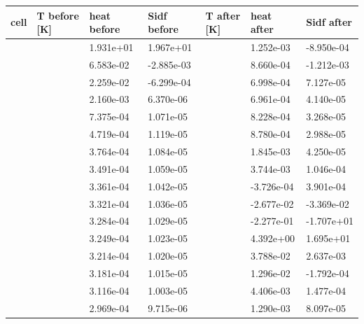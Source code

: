 \documentclass[english,a4paper]{my_memo}
\begin{document}
{\def\LTcaptype{none} %
{\small
\begin{longtable}[]{@{}>{\raggedright\arraybackslash}p{\dimexpr(\linewidth-14\tabcolsep)/7\relax}>{\raggedright\arraybackslash}p{\dimexpr(\linewidth-14\tabcolsep)/7\relax}>{\raggedright\arraybackslash}p{\dimexpr(\linewidth-14\tabcolsep)/7\relax}>{\raggedright\arraybackslash}p{\dimexpr(\linewidth-14\tabcolsep)/7\relax}>{\raggedright\arraybackslash}p{\dimexpr(\linewidth-14\tabcolsep)/7\relax}>{\raggedright\arraybackslash}p{\dimexpr(\linewidth-14\tabcolsep)/7\relax}>{\raggedright\arraybackslash}p{\dimexpr(\linewidth-14\tabcolsep)/7\relax}@{}}
\toprule\noalign{}
cell & T before {[}K{]} & heat before & Sidf before & T after {[}K{]} & heat after & Sidf after \\
\midrule\noalign{}
\endhead
\bottomrule\noalign{}
\endlastfoot
1 & 57.2 & 1.931e+01 & 1.967e+01 & 334.8 & 1.252e-03 & -8.950e-04 \\
2 & 229.0 & 6.583e-02 & -2.885e-03 & 416.9 & 8.660e-04 & -1.212e-03 \\
3 & 294.8 & 2.259e-02 & -6.299e-04 & 487.9 & 6.998e-04 & 7.127e-05 \\
10 & 495.8 & 2.160e-03 & 6.370e-06 & 858.3 & 6.961e-04 & 4.140e-05 \\
20 & 643.4 & 7.375e-04 & 1.071e-05 & 1227.6 & 8.228e-04 & 3.268e-05 \\
30 & 748.5 & 4.719e-04 & 1.119e-05 & 1514.9 & 8.780e-04 & 2.988e-05 \\
40 & 832.5 & 3.764e-04 & 1.084e-05 & 1784.3 & 1.845e-03 & 4.250e-05 \\
45 & 869.2 & 3.491e-04 & 1.059e-05 & 1985.5 & 3.744e-03 & 1.046e-04 \\
48 & 889.8 & 3.361e-04 & 1.042e-05 & 2231.2 & -3.726e-04 & 3.901e-04 \\
49 & 896.5 & 3.321e-04 & 1.036e-05 & 2381.5 & -2.677e-02 & -3.369e-02 \\
50 & 903.0 & 3.284e-04 & 1.029e-05 & 2618.9 & -2.277e-01 & -1.707e+01 \\
51 & 909.5 & 3.249e-04 & 1.023e-05 & 54.9 & 4.392e+00 & 1.695e+01 \\
52 & 916.0 & 3.214e-04 & 1.020e-05 & 184.0 & 3.788e-02 & 2.637e-03 \\
53 & 922.5 & 3.181e-04 & 1.015e-05 & 242.2 & 1.296e-02 & -1.792e-04 \\
55 & 935.5 & 3.116e-04 & 1.003e-05 & 319.2 & 4.406e-03 & 1.477e-04 \\
60 & 968.3 & 2.969e-04 & 9.715e-06 & 448.2 & 1.290e-03 & 8.097e-05 \\
\end{longtable}
}
}
\end{document}
